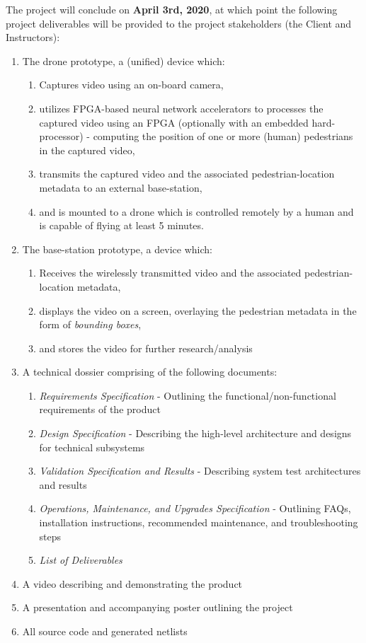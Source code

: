 The project will conclude on \textbf{April 3rd, 2020}, at which point the following project deliverables will be provided to the project stakeholders (the Client and Instructors):

\begin{enumerate}
\item The drone prototype, a (unified) device which:
\begin{enumerate}
\item Captures video using an on-board camera,
\item utilizes FPGA-based neural network accelerators to processes the captured video using an FPGA (optionally with an embedded hard-processor) - computing the position of one or more (human) pedestrians in the captured video,
\item transmits the captured video and the associated pedestrian-location metadata to an external base-station,
\item and is mounted to a drone which is controlled remotely by a human and is capable of flying at least 5 minutes.
\end{enumerate}
\item The base-station prototype, a device which:
\begin{enumerate}
\item Receives the wirelessly transmitted video and the associated pedestrian-location metadata,
\item displays the video on a screen, overlaying the pedestrian metadata in the form of \textit{bounding boxes},
\item and stores the video for further research/analysis
\end{enumerate}
\item A technical dossier comprising of the following documents:
\begin{enumerate}
\item \textit{Requirements Specification} - Outlining the functional/non-functional requirements of the product
\item \textit{Design Specification} - Describing the high-level architecture and designs for technical subsystems
\item \textit{Validation Specification and Results} - Describing system test architectures and results
\item \textit{Operations, Maintenance, and Upgrades Specification} - Outlining FAQs, installation instructions, recommended maintenance, and troubleshooting steps
\item \textit{List of Deliverables}
\end{enumerate}
\item A video describing and demonstrating the product
\item A presentation and accompanying poster outlining the project
\item All source code and generated netlists
\end{enumerate}
